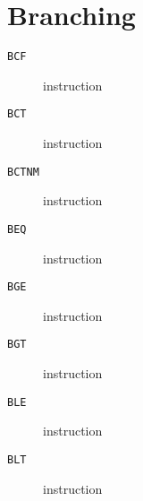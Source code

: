 \section{Branching}
\begin{description}
\item[\texttt{BCF}] instruction\\

\end{description}
\clearpage
\begin{description}
\item[\texttt{BCT}] instruction\\

\end{description}
\clearpage
\begin{description}
\item[\texttt{BCTNM}] instruction\\

\end{description}
\clearpage
\begin{description}
\item[\texttt{BEQ}] instruction\\

\end{description}
\clearpage
\begin{description}
\item[\texttt{BGE}] instruction\\

\end{description}
\clearpage
\begin{description}
\item[\texttt{BGT}] instruction\\

\end{description}
\clearpage
\begin{description}
\item[\texttt{BLE}] instruction\\

\end{description}
\clearpage
\begin{description}
\item[\texttt{BLT}] instruction\\

\end{description}
